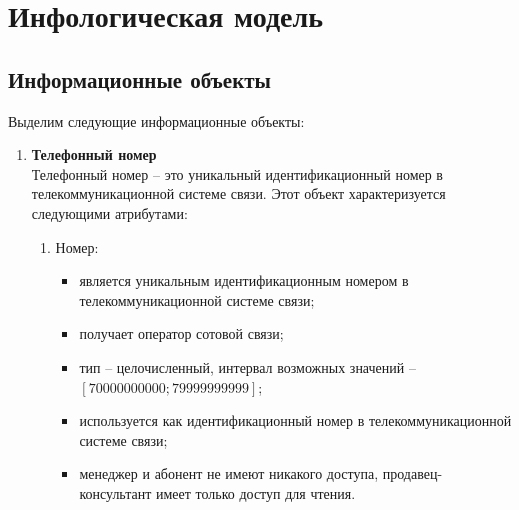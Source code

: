 \section{Инфологическая модель}\label{sec:infological-model}

\subsection{Информационные объекты}\label{subsec:information-objects}

Выделим следующие информационные объекты:
\begin{enumerate}
    \item \textbf{Телефонный номер} \\
    Телефонный номер -- это уникальный идентификационный номер в телекоммуникационной системе связи. Этот объект характеризуется следующими атрибутами:
    \begin{enumerate}
        \item Номер:
        \begin{itemize}
            \item является уникальным идентификационным номером в телекоммуникационной системе связи;
            \item получает оператор сотовой связи;
            \item тип -- целочисленный, интервал возможных значений -- $[70000000000; 79999999999]$;
            \item используется как идентификационный номер в телекоммуникационной системе связи;
            \item менеджер и абонент не имеют никакого доступа, продавец-консультант имеет только доступ для чтения.
        \end{itemize}


\end{enumerate}
\end{enumerate}
